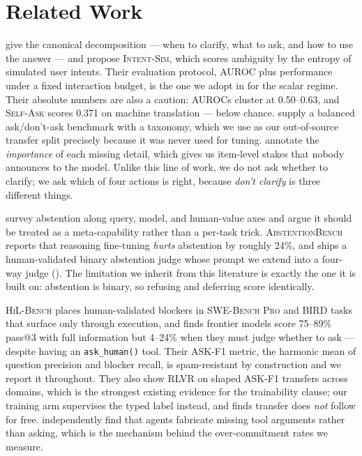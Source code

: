 \section{Related Work}
\label{sec:related}

 \citet{zhang2023clarify} give the canonical decomposition ---
when to clarify, what to ask, and how to use the answer --- and propose \textsc{Intent-Sim}, which
scores ambiguity by the entropy of simulated user intents. Their evaluation protocol, AUROC plus
performance under a fixed interaction budget, is the one we adopt in  for the
scalar regime. Their absolute numbers are also a caution: AUROCs cluster at 0.50--0.63, and
\textsc{Self-Ask} scores 0.371 on machine translation --- below chance. \citet{zhang2024clamber}
supply a balanced ask/don't-ask benchmark with a taxonomy, which we use as our out-of-source
transfer split precisely because it was never used for tuning. \citet{qian2024in3} annotate the
\emph{importance} of each missing detail, which gives us item-level stakes that nobody announces to
the model. Unlike this line of work, we do not ask whether to clarify; we ask which of four actions
is right, because \emph{don't clarify} is three different things.

 \citet{wen2024knowlimits} survey abstention along query, model,
and human-value axes and argue it should be treated as a meta-capability rather than a per-task
trick. \textsc{AbstentionBench} \citep{abstentionbench2025} reports that reasoning fine-tuning
\emph{hurts} abstention by roughly 24\%, and ships a human-validated binary abstention judge whose
prompt we extend into a four-way judge (). The limitation we inherit from this
literature is exactly the one it is built on: abstention is binary, so refusing and deferring
score identically.

 \textsc{HiL-Bench} \citep{trinh2026hilbench} places human-validated
blockers in \textsc{SWE-Bench Pro} and \textsc{BIRD} tasks that surface only through execution, and
finds frontier models score 75--89\% pass@3 with full information but 4--24\% when they must judge
whether to ask --- despite having an \texttt{ask\_human()} tool. Their ASK-F1 metric, the harmonic
mean of question precision and blocker recall, is spam-resistant by construction and we report it
throughout. They also show RLVR on shaped ASK-F1 transfers across domains, which is the strongest
existing evidence for the trainability clause; our  training arm supervises the
typed label instead, and finds transfer does \emph{not} follow for free.
\citet{ask2024awn} independently find that agents fabricate missing tool arguments rather than
asking, which is the mechanism behind the over-commitment rates we measure.

